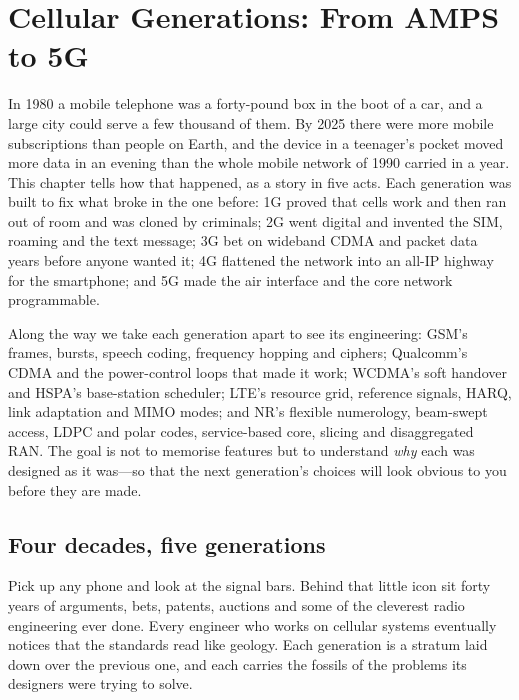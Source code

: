 \chapter{Cellular Generations: From AMPS to 5G}
\label{ch:cellular}

\begin{chapterintro}
In 1980 a mobile telephone was a forty-pound box in the boot of a car, and a large city could
serve a few thousand of them. By 2025 there were more mobile subscriptions than people on Earth,
and the device in a teenager's pocket moved more data in an evening than the whole mobile network
of 1990 carried in a year. This chapter tells how that happened, as a story in five acts. Each
generation was built to fix what broke in the one before: 1G proved that cells work and then ran
out of room and was cloned by criminals; 2G went digital and invented the SIM, roaming and the text
message; 3G bet on wideband CDMA and packet data years before anyone wanted it; 4G flattened the
network into an all-IP highway for the smartphone; and 5G made the air interface and the core
network programmable.

Along the way we take each generation apart to see its engineering: GSM's frames, bursts, speech
coding, frequency hopping and ciphers; Qualcomm's CDMA and the power-control loops that made it
work; WCDMA's soft handover and HSPA's base-station scheduler; LTE's resource grid, reference
signals, HARQ, link adaptation and MIMO modes; and NR's flexible numerology, beam-swept access, LDPC
and polar codes, service-based core, slicing and disaggregated RAN. The goal is not to memorise
features but to understand \emph{why} each was designed as it was---so that the next generation's
choices will look obvious to you before they are made.
\end{chapterintro}


\section{Four decades, five generations}
\label{sec:ch21:overview}

Pick up any phone and look at the signal bars. Behind that little icon sit forty years of
arguments, bets, patents, auctions and some of the cleverest radio engineering ever done. Every
engineer who works on cellular systems eventually notices that the standards read like geology.
Each generation is a stratum laid down over the previous one, and each carries the fossils of the
problems its designers were trying to solve.

